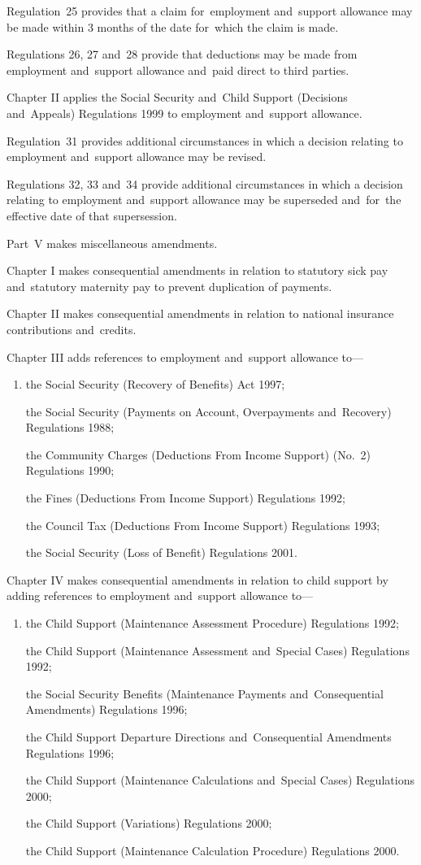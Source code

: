 \documentclass[12pt,a4paper]{article}
\begin{document}
Regulation~25 provides that a claim for~employment and~support allowance may be made within 3 months of the date for~which the claim is made.

Regulations 26, 27 and~28 provide that deductions may be made from employment and~support allowance and~paid direct to third parties.

Chapter II applies the Social Security and~Child Support (Decisions and~Appeals) Regulations 1999 to employment and~support allowance.

Regulation~31 provides additional circumstances in which a decision relating to employment and~support allowance may be revised.

Regulations 32, 33 and~34 provide additional circumstances in which a decision relating to employment and~support allowance may be superseded and~for~the effective date of that supersession.

Part~V makes miscellaneous amendments.

Chapter I makes consequential amendments in relation to statutory sick pay and~statutory maternity pay to prevent duplication of payments.

Chapter II makes consequential amendments in relation to national insurance contributions and~credits.

Chapter III adds references to employment and~support allowance to—
\begin{enumerate}\item[]
    the Social Security (Recovery of Benefits) Act 1997;

    the Social Security (Payments on Account, Overpayments and~Recovery) Regulations 1988;

    the Community Charges (Deductions From Income Support) (No.~2) Regulations 1990;

    the Fines (Deductions From Income Support) Regulations 1992;

    the Council Tax (Deductions From Income Support) Regulations 1993;

    the Social Security (Loss of Benefit) Regulations 2001. 
\end{enumerate}

Chapter IV makes consequential amendments in relation to child support by adding references to employment and~support allowance to—
\begin{enumerate}\item[]
    the Child Support (Maintenance Assessment Procedure) Regulations 1992;

    the Child Support (Maintenance Assessment and~Special Cases) Regulations 1992;

    the Social Security Benefits (Maintenance Payments and~Consequential Amendments) Regulations 1996;

    the Child Support Departure Directions and~Consequential Amendments Regulations 1996;

    the Child Support (Maintenance Calculations and~Special Cases) Regulations 2000;

    the Child Support (Variations) Regulations 2000;

    the Child Support (Maintenance Calculation Procedure) Regulations 2000. 
\end{enumerate}
\end{document}
